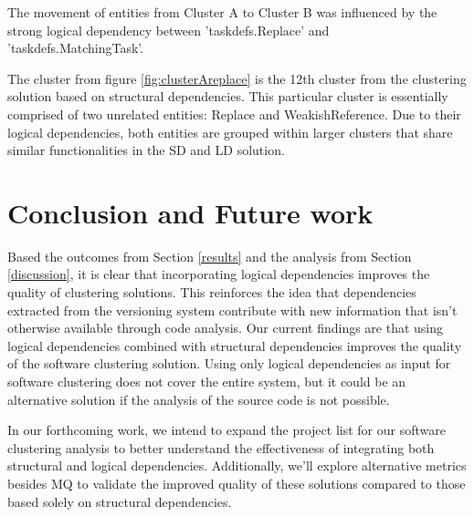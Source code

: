 \documentclass[conference, a4paper]{IEEEtran}
\begin{document}
The movement of entities from Cluster A to Cluster B was influenced by the strong logical dependency between 'taskdefs.Replace' and 'taskdefs.MatchingTask'.

The cluster from figure \ref{fig:clusterAreplace} is the 12th cluster from the clustering solution based on structural dependencies. This particular cluster is essentially comprised of two unrelated entities: Replace and WeakishReference. Due to their logical dependencies, both entities are grouped within larger clusters that share similar functionalities in the SD and LD solution.



\section{Conclusion and Future work}
\label{conclusion}

Based the outcomes from Section \ref{results} and the analysis from Section \ref{discussion}, it is clear that incorporating logical dependencies improves the quality of clustering solutions. 
This reinforces the idea that dependencies extracted from the versioning system contribute with new information that isn't otherwise available through code analysis. Our current findings are that using logical dependencies combined with structural dependencies improves the quality of the software clustering solution. Using only logical dependencies as input for software clustering does not cover the entire system, but it could be an alternative solution if the analysis of the source code is not possible.

In our forthcoming work, we intend to expand the project list for our software clustering analysis to better understand the effectiveness of integrating both structural and logical dependencies. Additionally, we'll explore alternative metrics besides MQ to validate the improved quality of these solutions compared to those based solely on structural dependencies.



\end{document}
